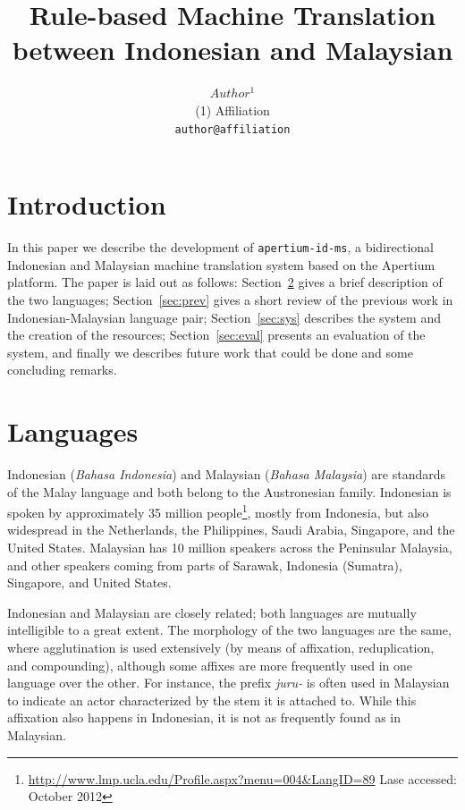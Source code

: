 \documentclass[10pt,a5paper,twoside]{article}
\title{Rule-based Machine Translation between Indonesian and Malaysian}
\author{$Author^{1}$ \\
{\small  	(1) Affiliation\\
  \texttt{author@affiliation} \\ 
}}
\begin{document}
\maketitle



\newpage
\section{Introduction}
In this paper we describe the development of \texttt{\small{apertium-id-ms}}, a bidirectional Indonesian and Malaysian machine translation system based on the Apertium platform. The paper is laid out as follows: Section~\ref{sec:lang} gives a brief description of the two languages; Section~\ref{sec:prev} gives a short review of the previous work in Indonesian-Malaysian language pair; Section~\ref{sec:sys} describes the system and the creation of the resources; Section~\ref{sec:eval} presents an evaluation of the system, and finally we describes future work that could be done and some concluding remarks.

\section{Languages}
\label{sec:lang}
Indonesian (\emph{Bahasa Indonesia}) and Malaysian (\emph{Bahasa Malaysia}) are standards of the Malay language and both belong to the Austronesian family. Indonesian is spoken by approximately 35 million people\footnote{\url{http://www.lmp.ucla.edu/Profile.aspx?menu=004&LangID=89} Lase accessed: October 2012}, mostly from Indonesia, but also widespread in the Netherlands, the Philippines, Saudi Arabia, Singapore, and the United States. Malaysian has 10 million speakers across the Peninsular Malaysia, and other speakers coming from parts of Sarawak, Indonesia (Sumatra), Singapore, and United States.

Indonesian and Malaysian are closely related; both languages are mutually intelligible to a great extent. The morphology of the two languages are the same, where agglutination is used extensively (by means of affixation, reduplication, and compounding), although some affixes are more frequently used in one language over the other. For instance, the prefix \emph{juru-} is often used in Malaysian to indicate an actor characterized by the stem it is attached to. While this affixation also happens in Indonesian, it is not as frequently found as in Malaysian.
\end{document}
